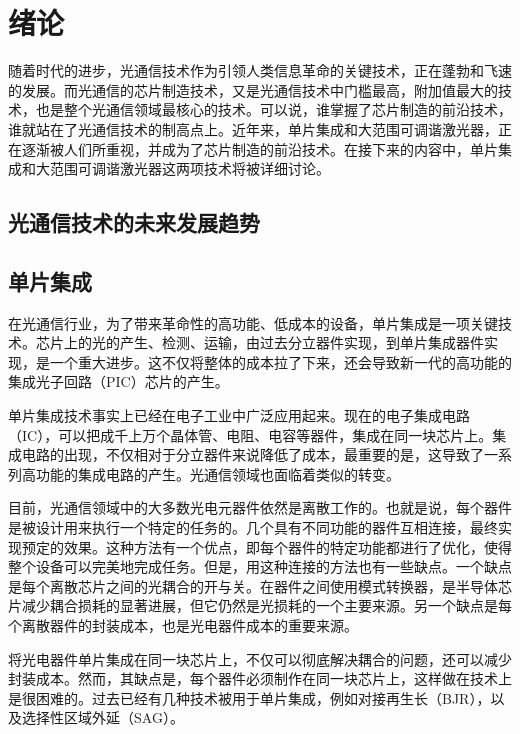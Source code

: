 \documentclass{ZJUthesis}
\begin{document}
\ZJUcontents

\ZJUmainmatter

\chapter{绪论}

随着时代的进步，光通信技术作为引领人类信息革命的关键技术，正在蓬勃和飞速的发展。而光通信的芯片制造技术，又是光通信技术中门槛最高，附加值最大的技术，也是整个光通信领域最核心的技术。可以说，谁掌握了芯片制造的前沿技术，谁就站在了光通信技术的制高点上。近年来，单片集成和大范围可调谐激光器，正在逐渐被人们所重视，并成为了芯片制造的前沿技术。在接下来的内容中，单片集成和大范围可调谐激光器这两项技术将被详细讨论。

\section{光通信技术的未来发展趋势}

\section{单片集成}

在光通信行业，为了带来革命性的高功能、低成本的设备，单片集成是一项关键技术。芯片上的光的产生、检测、运输，由过去分立器件实现，到单片集成器件实现，是一个重大进步。这不仅将整体的成本拉了下来，还会导致新一代的高功能的集成光子回路（PIC）芯片的产生。

单片集成技术事实上已经在电子工业中广泛应用起来。现在的电子集成电路（IC），可以把成千上万个晶体管、电阻、电容等器件，集成在同一块芯片上。集成电路的出现，不仅相对于分立器件来说降低了成本，最重要的是，这导致了一系列高功能的集成电路的产生。光通信领域也面临着类似的转变。

目前，光通信领域中的大多数光电元器件依然是离散工作的。也就是说，每个器件是被设计用来执行一个特定的任务的。几个具有不同功能的器件互相连接，最终实现预定的效果。这种方法有一个优点，即每个器件的特定功能都进行了优化，使得整个设备可以完美地完成任务。但是，用这种连接的方法也有一些缺点。一个缺点是每个离散芯片之间的光耦合的开与关。在器件之间使用模式转换器，是半导体芯片减少耦合损耗的显著进展，但它仍然是光损耗的一个主要来源。另一个缺点是每个离散器件的封装成本，也是光电器件成本的重要来源。

将光电器件单片集成在同一块芯片上，不仅可以彻底解决耦合的问题，还可以减少封装成本。然而，其缺点是，每个器件必须制作在同一块芯片上，这样做在技术上是很困难的。过去已经有几种技术被用于单片集成，例如对接再生长（BJR），以及选择性区域外延（SAG）。
\end{document}
